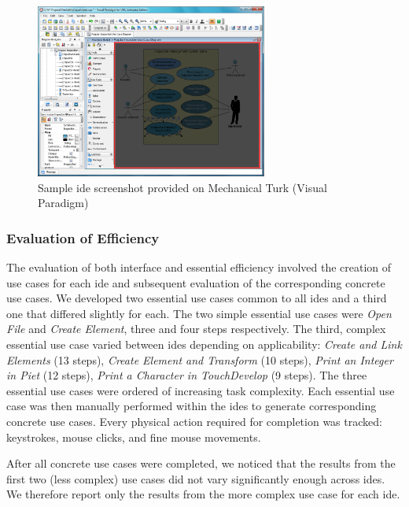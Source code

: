 \begin{figure}[!t]
\centering
\includegraphics[width=3in]{images/clutter_shot}
\caption{Sample \ac{ide} screenshot provided on Mechanical Turk (Visual
Paradigm)}
\label{fig:clutterexample}
\end{figure}


\subsubsection{Evaluation of Efficiency} \label{subsubsec:efficiency}

The evaluation of both interface and essential efficiency involved the
creation of use cases for each \ac{ide} and subsequent evaluation of the
corresponding concrete use cases. We developed two essential use cases
common to all \acp{ide} and a third one that differed slightly for each.
The two simple essential use cases were \emph{Open File} and \emph{Create
Element}, three and four steps respectively. The third, complex essential
use case varied between \acp{ide} depending on applicability: \emph{Create
and Link Elements} (13 steps), \emph{Create Element and Transform} (10
steps), \emph{Print an Integer in Piet} (12 steps), \emph{Print a Character
in TouchDevelop} (9 steps). The three essential use cases were ordered of
increasing task complexity. Each essential use case was then manually
performed within the \acp{ide} to generate corresponding concrete use
cases. Every physical action required for completion was tracked:
keystrokes, mouse clicks, and fine mouse movements.

After all concrete use cases were completed, we noticed that the results
from the first two (less complex) use cases did not vary significantly
enough across \acp{ide}. We therefore report only the results from the
more complex use case for each \ac{ide}.

